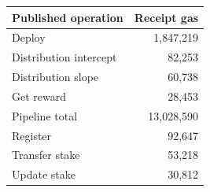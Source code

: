 \begin{tabular}{lr}
\toprule
Published operation & Receipt gas \\
\midrule
Deploy & 1,847,219 \\
Distribution intercept & 82,253 \\
Distribution slope & 60,738 \\
Get reward & 28,453 \\
Pipeline total & 13,028,590 \\
Register & 92,647 \\
Transfer stake & 53,218 \\
Update stake & 30,812 \\
\bottomrule
\end{tabular}
